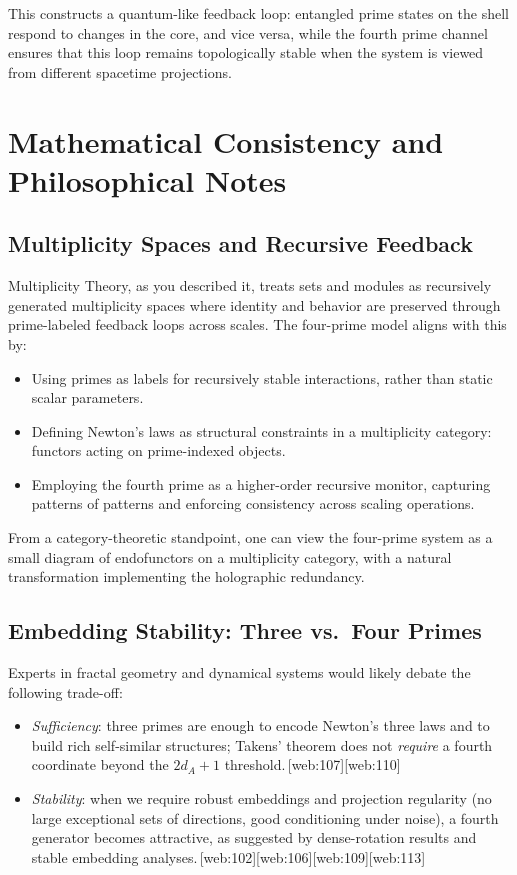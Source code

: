 \documentclass[11pt]{article}
\begin{document}
This constructs a quantum-like feedback loop:
entangled prime states on the shell respond to changes in the core,
and vice versa, while the fourth prime channel ensures that this loop
remains topologically stable when the system is viewed from different
spacetime projections.

\section{Mathematical Consistency and Philosophical Notes}

\subsection{Multiplicity Spaces and Recursive Feedback}

Multiplicity Theory, as you described it, treats sets and modules as
recursively generated multiplicity spaces where identity and behavior are
preserved through prime-labeled feedback loops across scales.
The four-prime model aligns with this by:

\begin{itemize}[leftmargin=*]
  \item Using primes as labels for recursively stable interactions,
  rather than static scalar parameters.
  \item Defining Newton's laws as structural constraints in a
  multiplicity category: functors acting on prime-indexed objects.
  \item Employing the fourth prime as a higher-order recursive monitor,
  capturing patterns of patterns and enforcing consistency across
  scaling operations.
\end{itemize}

From a category-theoretic standpoint, one can view the four-prime system
as a small diagram of endofunctors on a multiplicity category, with a
natural transformation implementing the holographic redundancy.

\subsection{Embedding Stability: Three vs.\ Four Primes}

Experts in fractal geometry and dynamical systems would likely debate
the following trade-off:

\begin{itemize}[leftmargin=*]
  \item \emph{Sufficiency}: three primes are enough to encode Newton's
  three laws and to build rich self-similar structures; Takens' theorem
  does not \emph{require} a fourth coordinate beyond the $2d_A+1$
  threshold.\,[web:107][web:110]
  \item \emph{Stability}: when we require robust embeddings and
  projection regularity (no large exceptional sets of directions, good
  conditioning under noise), a fourth generator becomes attractive, as
  suggested by dense-rotation results and stable embedding analyses.\,[web:102][web:106][web:109][web:113]
\end{itemize}
\end{document}
